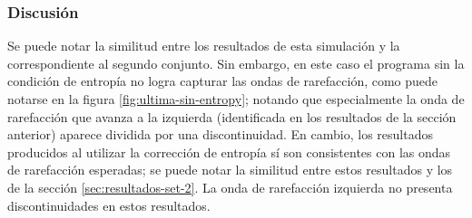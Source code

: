 \subsubsection{Discusión}
Se puede notar la similitud entre los resultados de esta simulación y la correspondiente al segundo conjunto. Sin embargo, en este caso el programa sin la condición de entropía no logra capturar las ondas de rarefacción, como puede notarse en la figura \ref{fig:ultima-sin-entropy}; notando que especialmente la onda de rarefacción que avanza a la izquierda (identificada en los resultados de la sección anterior) aparece dividida por una discontinuidad. En cambio, los resultados producidos al utilizar la corrección de entropía sí son consistentes con las ondas de rarefacción esperadas; se puede notar la similitud entre estos resultados y los de la sección \ref{sec:resultados-set-2}. La onda de rarefacción izquierda no presenta discontinuidades en estos resultados.